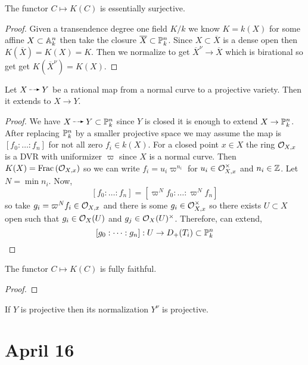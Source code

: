 \documentclass[12pt]{article}
\begin{document}
\begin{prop}
The functor $C \mapsto K(C)$ is essentially surjective. 
\end{prop}

\begin{proof}
Given a transendence degree one field $K / k$ we know $K = k(X)$ for some affine $X \subset \A^n_k$ then take the closure $\overline{X} \subset \P^n_k$. Since $X \subset \overline{X}$ is a dense open then $K(\overline{X}) = K(X) = K$. Then we normalize to get $\overline{X}^\nu \to \overline{X}$ which is birational so get get $K(\overline{X}^\nu) = K(X)$. 
\end{proof}

\begin{lemma}
Let $X \rat Y$ be a rational map from a normal curve to a projective variety. Then it extends to $X \to Y$. 
\end{lemma}

\begin{proof}
We have $X \rat Y \subset \P^n_k$ since $Y$ is closed it is enough to extend $X \to \P^n_k$. After replacing $\P^n_k$ by a smaller projective space we may assume the map is $[f_0 : \dots : f_n]$ for not all zero $f_i \in k(X)$. For a closed point $x \in X$ the ring $\stalk{X}{x}$ is a DVR with uniformizer $\varpi$ since $X$ is a normal curve. Then $K(X) = \Frac{\stalk{X}{x}}$ so we can write $f_i = u_i \varpi^{n_i}$ for $u_i \in \stalk{X}{x}^\times$ and $n_i \in \Z$. Let $N = \min{n_i}$. Now,
\[ [f_0 : \dots : f_n] = [ \varpi^{N} f_0 : \dots : \varpi^{N} f_n] \]
so take $g_i = \varpi^N f_i \in \stalk{X}{x}$ and there is some $g_i \in \stalk{X}{x}^\times$ so there exists $U \subset X$ open such that $g_i \in \struct{X}(U)$ and $g_j \in \struct{X}(U)^\times$. Therefore, can extend,
\[ [g_0 : \dots : g_n] : U \to D_+(T_i) \subset \P^n_k \]

\end{proof}

\begin{prop}
The functor $C \mapsto K(C)$ is fully faithful.
\end{prop}

\begin{proof}

\end{proof}

\begin{prop}
If $Y$ is projective then its normalization $Y^\nu$ is projective. 
\end{prop}

\section{April 16}
\end{document}
